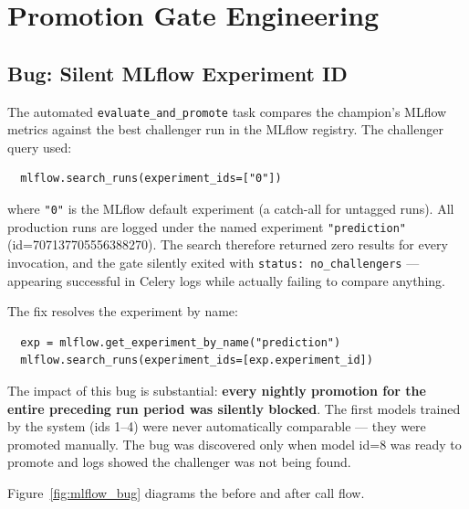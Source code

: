 \documentclass[conference]{IEEEtran}
\begin{document}
\section{Promotion Gate Engineering}
\label{sec:gate}

\subsection{Bug: Silent MLflow Experiment ID}
\label{subsec:mlflow_bug}

The automated \texttt{evaluate\_and\_promote} task compares the
champion's MLflow metrics against the best challenger run in the
MLflow registry.  The challenger query used:
\begin{verbatim}
  mlflow.search_runs(experiment_ids=["0"])
\end{verbatim}
where \texttt{"0"} is the MLflow default experiment (a catch-all for
untagged runs).  All production runs are logged under the named
experiment \texttt{"prediction"} (id=707137705556388270).  The search
therefore returned zero results for every invocation, and the gate
silently exited with \texttt{status: no\_challengers} — appearing
successful in Celery logs while actually failing to compare anything.

The fix resolves the experiment by name:
\begin{verbatim}
  exp = mlflow.get_experiment_by_name("prediction")
  mlflow.search_runs(experiment_ids=[exp.experiment_id])
\end{verbatim}

The impact of this bug is substantial: \textbf{every nightly promotion
for the entire preceding run period was silently blocked}.  The first
models trained by the system (ids 1--4) were never automatically
comparable — they were promoted manually.  The bug was discovered only
when model id=8 was ready to promote and logs showed the challenger
was not being found.

Figure~\ref{fig:mlflow_bug} diagrams the before and after call flow.
\end{document}

